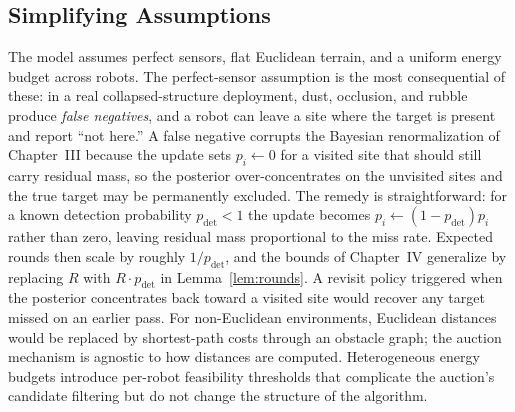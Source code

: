 \begin{doublespacing}
\subsection{Simplifying Assumptions}

The model assumes perfect sensors, flat Euclidean terrain, and a
uniform energy budget across robots. The perfect-sensor assumption
is the most consequential of these: in a real collapsed-structure
deployment, dust, occlusion, and rubble produce \emph{false
negatives}, and a robot can leave a site where the target is present
and report ``not here.'' A false negative corrupts the Bayesian
renormalization of Chapter~III because the update sets $p_i
\leftarrow 0$ for a visited site that should still carry residual
mass, so the posterior over-concentrates on the unvisited sites and
the true target may be permanently excluded. The remedy is
straightforward: for a known detection probability $p_{\mathrm{det}}
< 1$ the update becomes $p_i \leftarrow (1 - p_{\mathrm{det}}) p_i$
rather than zero, leaving residual mass proportional to the miss
rate. Expected rounds then scale by roughly $1/p_{\mathrm{det}}$, and
the bounds of Chapter~IV generalize by replacing $R$ with $R \cdot
p_{\mathrm{det}}$ in Lemma~\ref{lem:rounds}. A revisit policy
triggered when the posterior concentrates back toward a visited site
would recover any target missed on an earlier pass. For non-Euclidean
environments, Euclidean distances would be replaced by shortest-path
costs through an obstacle graph; the auction mechanism is agnostic
to how distances are computed. Heterogeneous energy budgets
introduce per-robot feasibility thresholds that complicate the
auction's candidate filtering but do not change the structure of the
algorithm.

\end{doublespacing}
